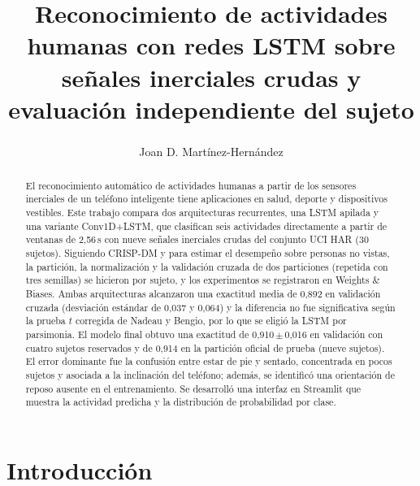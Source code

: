 \documentclass[runningheads]{llncs}
\renewcommand{\orcidID}[1]{\textsuperscript{\scriptsize\orcidlink{#1}}}
\begin{document}
%
\title{Reconocimiento de actividades humanas con redes LSTM sobre señales inerciales crudas y evaluación independiente del sujeto}
%
\author{Joan D. Martínez-Hernández\orcidID{0009-0002-2610-4441}}
%
\maketitle
%
\begin{abstract}
El reconocimiento automático de actividades humanas a partir de los sensores
inerciales de un teléfono inteligente tiene aplicaciones en salud, deporte y
dispositivos vestibles. Este trabajo compara dos arquitecturas recurrentes, una
LSTM apilada y una variante Conv1D+LSTM, que clasifican seis actividades
directamente a partir de ventanas de 2,56\,s con nueve señales inerciales crudas
del conjunto UCI HAR (30 sujetos). Siguiendo CRISP-DM y para estimar el
desempeño sobre personas no vistas, la partición, la normalización y la
validación cruzada de dos particiones (repetida con tres semillas) se hicieron
por sujeto, y los experimentos se registraron en Weights \& Biases. Ambas arquitecturas
alcanzaron una exactitud media de 0,892 en validación cruzada (desviación
estándar de 0,037 y 0,064) y la diferencia no fue significativa según la
prueba $t$ corregida de Nadeau y Bengio, por lo que se eligió la LSTM por
parsimonia. El modelo final obtuvo una exactitud de 0,910\,$\pm$\,0,016 en
validación con cuatro sujetos reservados y de 0,914 en la partición oficial de
prueba (nueve sujetos). El error dominante fue la confusión entre estar de pie y
sentado, concentrada en pocos sujetos y asociada a la inclinación del teléfono;
además, se identificó una orientación de reposo ausente en el entrenamiento.
Se desarrolló una interfaz en Streamlit que muestra la actividad predicha y la
distribución de probabilidad por clase.
%
\end{abstract}
%
\section{Introducción}
\end{document}
